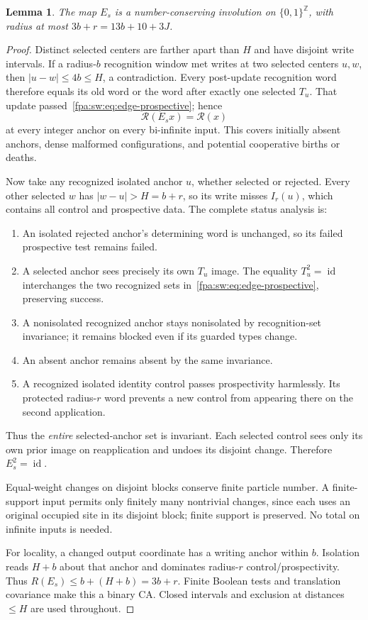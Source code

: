 \documentclass[11pt,a4paper]{article}
\numberwithin{equation}{section}
\newtheorem{lemma}[theorem]{Lemma}
\newcommand{\X}{\{0,1\}^{\mathbb Z}}\newcommand{\id}{\operatorname{id}}
\newcommand{\Rec}{\mathcal R}\newcommand{\Sel}{\mathcal S}
\newcommand{\Es}{E_s}\newcommand{\Ps}{P_s}\newcommand{\Fs}{F_s}\newcommand{\Cand}{\mathcal C_P}
\begin{document}
\begin{lemma}\label{fpa:sw:lem:edge}
The map $\Es$ is a number-conserving involution on $\X$, with radius at most $3b+r=13b+10+3J$.
\end{lemma}
\begin{proof}
Distinct selected centers are farther apart than $H$ and have disjoint write intervals. If a radius-$b$ recognition window met writes at two selected centers $u,w$, then $|u-w|\le4b\le H$, a contradiction. Every post-update recognition word therefore equals its old word or the word after exactly one selected $T_u$. That update passed~\eqref{fpa:sw:eq:edge-prospective}; hence
\[
\Rec(\Es x)=\Rec(x)
\]
at every integer anchor on every bi-infinite input. This covers initially absent anchors, dense malformed configurations, and potential cooperative births or deaths.

Now take any recognized isolated anchor $u$, whether selected or rejected. Every other selected $w$ has $|w-u|>H=b+r$, so its write misses $I_r(u)$, which contains all control and prospective data. The complete status analysis is:
\begin{enumerate}
\item An isolated rejected anchor's determining word is unchanged, so its failed prospective test remains failed.
\item A selected anchor sees precisely its own $T_u$ image. The equality $T_u^2=\id$ interchanges the two recognized sets in~\eqref{fpa:sw:eq:edge-prospective}, preserving success.
\item A nonisolated recognized anchor stays nonisolated by recognition-set invariance; it remains blocked even if its guarded types change.
\item An absent anchor remains absent by the same invariance.
\item A recognized isolated identity control passes prospectivity harmlessly. Its protected radius-$r$ word prevents a new control from appearing there on the second application.
\end{enumerate}
Thus the \emph{entire} selected-anchor set is invariant. Each selected control sees only its own prior image on reapplication and undoes its disjoint change. Therefore $\Es^2=\id$.

Equal-weight changes on disjoint blocks conserve finite particle number. A finite-support input permits only finitely many nontrivial changes, since each uses an original occupied site in its disjoint block; finite support is preserved. No total on infinite inputs is needed.

For locality, a changed output coordinate has a writing anchor within $b$. Isolation reads $H+b$ about that anchor and dominates radius-$r$ control/prospectivity. Thus $R(\Es)\le b+(H+b)=3b+r$. Finite Boolean tests and translation covariance make this a binary CA. Closed intervals and exclusion at distances $\le H$ are used throughout.
\end{proof}
\end{document}
